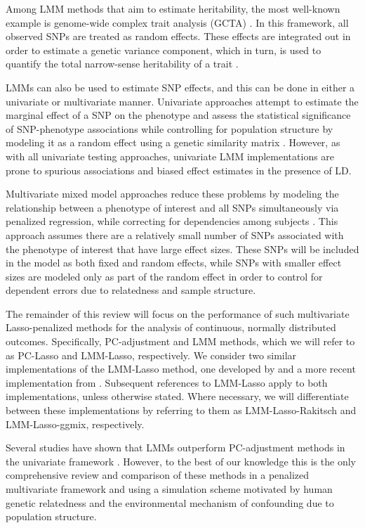 Among LMM methods that aim to estimate heritability, the most well-known example is genome-wide complex trait analysis (GCTA) \citep{yang2011gcta}. In this framework, all observed SNPs are treated as random effects. These effects are integrated out in order to estimate a genetic variance component, which in turn, is used to quantify the total narrow-sense heritability of a trait \citep{yang2010common}.

LMMs can also be used to estimate SNP effects, and this can be done in either a univariate or multivariate manner. Univariate approaches attempt to estimate the marginal effect of a SNP on the phenotype and assess the statistical significance of SNP-phenotype associations while controlling for population structure by modeling it as a random effect using a genetic similarity matrix \citep{yu2006unified, kang2010variance, kang2008efficient}. However, as with all univariate testing approaches, univariate LMM implementations are prone to spurious associations and biased effect estimates in the presence of LD. 

Multivariate mixed model approaches reduce these problems by modeling the relationship between a phenotype of interest and all SNPs simultaneously via penalized regression, while correcting for dependencies among subjects \citep{Rakitsch2012, bhatnagar2019simultaneous}. This approach assumes there are a relatively small number of SNPs associated with the phenotype of interest that have large effect sizes. These SNPs will be included in the model as both fixed and random effects, while SNPs with smaller effect sizes are modeled only as part of the random effect in order to control for dependent errors due to relatedness and sample structure. 

The remainder of this review will focus on the performance of such multivariate Lasso-penalized methods for the analysis of continuous, normally distributed outcomes. Specifically, PC-adjustment and LMM methods, which we will refer to as PC-Lasso and LMM-Lasso, respectively. We consider two similar implementations of the LMM-Lasso method, one developed by \citet{Rakitsch2012} and a more recent implementation from \citet{bhatnagar2019simultaneous}. Subsequent references to LMM-Lasso apply to both implementations, unless otherwise stated. Where necessary, we will differentiate between these implementations by referring to them as LMM-Lasso-Rakitsch and LMM-Lasso-ggmix, respectively. 

Several studies have shown that LMMs outperform PC-adjustment methods in the univariate framework \citep{wang2013analytical, kang2010variance, zhao2007arabidopsis}. However, to the best of our knowledge this is the only comprehensive review and comparison of these methods in a penalized multivariate framework and using a simulation scheme motivated by human genetic relatedness and the environmental mechanism of confounding due to population structure.\\

